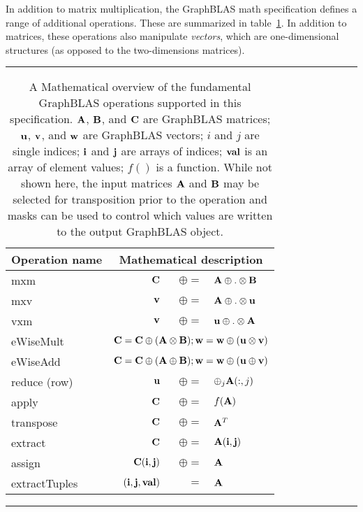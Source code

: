 In addition to matrix multiplication, the GraphBLAS math specification defines
a range of additional operations.  These are summarized in table~\ref{Tab:GraphBLASOps}.
In addition to matrices, these operations also manipulate \emph{vectors}, which are
one-dimensional structures (as opposed to the two-dimensions matrices).

\begin{table}[h]
\hrule
\begin{center}
\caption{A Mathematical overview of the fundamental GraphBLAS operations supported
in this specification. ${\bf A}$, ${\bf B}$, and ${\bf C}$ are GraphBLAS matrices; 
${\bf u}$, ${\bf v}$, and ${\bf w}$ are GraphBLAS vectors; $i$ and $j$ are single indices;
$\bold{i}$ and $\bold{j}$ are arrays of indices;
$\bold{val}$ is an array of element values;  $f()$ is a function.
While not shown here, the input 
matrices ${\bf A}$ and ${\bf B}$ may be selected for transposition prior to 
the operation and masks can be used to control which values are written to the output GraphBLAS object.}
\label{Tab:GraphBLASOps}
\begin{tabular}{l|rrl}
{\sf Operation name} & \multicolumn{3}{c}{Mathematical description}  \\
\hline
{\sf mxm}          & ${\bf C}$ & $\oplus=$ & ${\bf A} \oplus.\otimes {\bf B}$  \\
{\sf mxv}          & ${\bf v}$ & $\oplus=$ & ${\bf A} \oplus.\otimes {\bf u}$  \\
{\sf vxm}          & ${\bf v}$ & $\oplus=$ & ${\bf u} \oplus.\otimes {\bf A}$  \\
{\sf eWiseMult}    & \multicolumn{3}{c}{${\bf C} = {\bf C} \oplus ({\bf A} \otimes {\bf B}) ; {\bf w} = {\bf w} \oplus ({\bf u} \otimes {\bf v})$} \\
{\sf eWiseAdd}     & \multicolumn{3}{c}{${\bf C} = {\bf C} \oplus ({\bf A} \oplus {\bf B}) ; {\bf w} = {\bf w} \oplus ({\bf u} \oplus {\bf v})$} \\
{\sf reduce} (row) & ${\bf u}$ & $\oplus=$ & $\oplus_j{\bf A}(:,j)$  \\
{\sf apply}        & ${\bf C}$ & $\oplus=$ & $f({\bf A})$ \\
{\sf transpose}    & ${\bf C}$ & $\oplus=$ & ${\bf A}^T$ \\
{\sf extract}      & ${\bf C}$ & $\oplus=$ & ${\bf A}({\bf i},{\bf j})$ \\
{\sf assign}       & ${\bf C}({\bf i},{\bf j})$ & $\oplus=$ & ${\bf A}$ \\
{\sf extractTuples}& $({\bf i},{\bf j},{\bf val})$ & $=$ & ${\bf A}$ \\
\end{tabular}
\end{center}
\hrule
\end{table}

